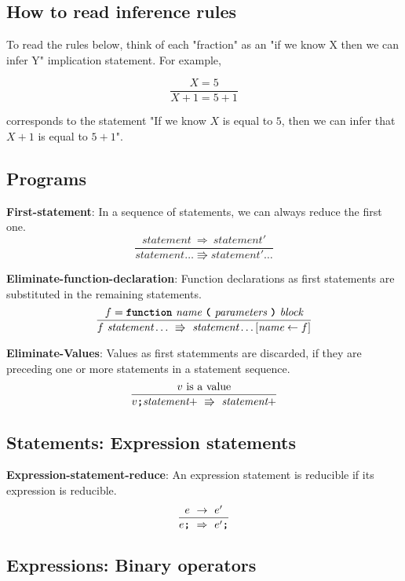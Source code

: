 \subsection*{How to read inference rules}

To read the rules below, think of each "fraction" as an
"if we know X then we can infer Y" implication statement.
For example,

\[
\frac{
  X = 5
}{
  X + 1 = 5 + 1
}
\]

corresponds to the statement
"If we know $X$ is equal to $5$,
then we can infer that $X + 1$ is equal to $5 + 1$".


\subsection*{Programs}


\textbf{First-statement}: In a sequence of statements, we can always
reduce the first one.
\[
\frac{
  \textit{statement}\ \Rightarrow\ \textit{statement}'
}{  
  \textit{statement} \ldots
  \Rrightarrow 
  \textit{statement}' \ldots
}
\]

\vspace{10mm}

\textbf{Eliminate-function-declaration}: Function declarations as first
statements are substituted in the remaining statements.
\[
\frac{
             f = \textbf{\texttt{function}}\  \textit{name} \ 
                 \textbf{\texttt{(}}\  \textit{parameters}
                 \ \textbf{\texttt{)}}\ \textit{block}
}{
f\ \textit{statement} \ldots\ 
  \Rrightarrow\ 
  \textit{statement} \ldots[\textit{name} \leftarrow f]
}
\]

\vspace{10mm}
\textbf{Eliminate-Values}: Values as first statemments are discarded, if
they are preceding one or more statements in a statement sequence.
\[
\frac{
v \ \mbox{is a value}  
}{
v \textbf{\texttt{;}} \textit{statement}+\ 
   \Rrightarrow  \ 
  \textit{statement}+
}
\]

\subsection*{Statements: Expression statements}

\textbf{Expression-statement-reduce}: An expression statement
is reducible if its expression is reducible.
\[
\frac{
  e\ \rightarrow\ e'
}{  
  e \textbf{\texttt{;}}
  \ \Rightarrow \ 
  e' \textbf{\texttt{;}}
}
\]


\subsection*{Expressions: Binary operators}

